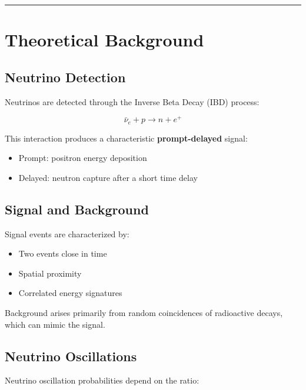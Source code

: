 \documentclass[
  authoryear,
  preprint]{elsarticle}
\providecommand{\tightlist}{%
  \setlength{\itemsep}{0pt}\setlength{\parskip}{0pt}}
\begin{document}
\begin{center}\rule{0.5\linewidth}{0.5pt}\end{center}

\section{Theoretical Background}\label{theoretical-background}

\subsection{Neutrino Detection}\label{neutrino-detection}

Neutrinos are detected through the Inverse Beta Decay (IBD) process:

\[
\bar{\nu}_e + p \rightarrow n + e^+
\]

This interaction produces a characteristic \textbf{prompt-delayed}
signal:

\begin{itemize}
\tightlist
\item
  Prompt: positron energy deposition\\
\item
  Delayed: neutron capture after a short time delay
\end{itemize}

\subsection{Signal and Background}\label{signal-and-background}

Signal events are characterized by:

\begin{itemize}
\tightlist
\item
  Two events close in time
\item
  Spatial proximity
\item
  Correlated energy signatures
\end{itemize}

Background arises primarily from random coincidences of radioactive
decays, which can mimic the signal.

\subsection{Neutrino Oscillations}\label{neutrino-oscillations}

Neutrino oscillation probabilities depend on the ratio:
\end{document}
